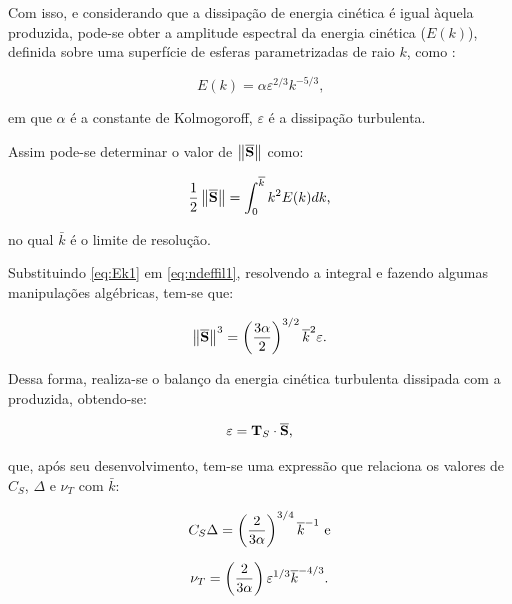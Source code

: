 \documentclass[_ArquivoPrincipal.tex]{subfiles}
\begin{document}
Com isso, e considerando que a dissipação de energia cinética é igual àquela produzida, pode-se obter a amplitude espectral da energia cinética ($E(k)$), definida sobre uma superfície de esferas parametrizadas de raio $k$, como \cite{hughes2000large}:

\begin{equation}
    E(k)=\alpha\varepsilon^{2/3}k^{-5/3}\text{,}\label{eq:Ek1}
\end{equation}

\noindent em que $\alpha$ é a constante de Kolmogoroff, $\varepsilon$ é a dissipação turbulenta.

Assim pode-se determinar o valor de $\left\lVert{\overline{\mathbf{S}}}\right\lVert$ como:

\begin{equation}
    \frac{1}{2}\left\lVert{\overline{\mathbf{S}}}\right\lVert=\int_0^{\overline{k}}{k^2E(k)dk}\text{,}\label{eq:ndeffil1}
\end{equation}

\noindent no qual $\bar{k}$ é o limite de resolução.

Substituindo \ref{eq:Ek1} em \ref{eq:ndeffil1}, resolvendo a integral e fazendo algumas manipulações algébricas, tem-se que:

\begin{equation}
    \left\lVert{\overline{\mathbf{S}}}\right\lVert^3=\left({\frac{3\alpha}{2}}\right)^{3/2}\overline{k}^2\varepsilon\text{.}
\end{equation}

Dessa forma, realiza-se o balanço da energia cinética turbulenta dissipada com a produzida, obtendo-se:

\begin{equation}
    \varepsilon=\mathbf{T}_S\cdot\overline{\mathbf{S}}\text{,}
\end{equation}

\noindent que, após seu desenvolvimento, tem-se uma expressão que relaciona os valores de $C_S$, $\Delta$ e $\nu_T$ com $\bar{k}$:

\begin{equation}
    C_S\Delta=\left({\frac{2}{3\alpha}}\right)^{3/4}\overline{k}^{-1}\text{ e}
\end{equation}

\begin{equation}
    \nu_T=\left({\frac{2}{3\alpha}}\right)\varepsilon^{1/3}\overline{k}^{-4/3}\text{.}
\end{equation}
\end{document}
